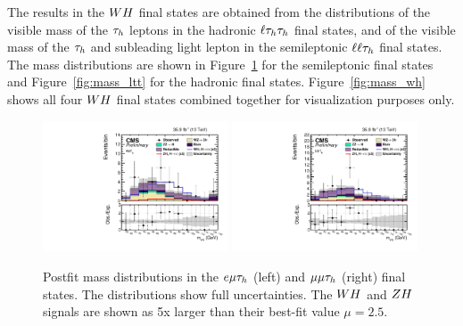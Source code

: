 The results in the $WH$ final states are obtained from the distributions of the 
visible mass of the $\tau_{h}$ leptons in the hadronic $\ell\tau_{h}\tau_{h}$ final states, 
and of the visible mass of the $\tau_{h}$ and subleading light lepton in the 
semileptonic $\ell\ell\tau_{h}$ final states. The mass distributions
are shown in Figure~\ref{fig:mass_llt} for the semileptonic final states 
and Figure~\ref{fig:mass_ltt} for the hadronic final states. 
Figure~\ref{fig:mass_wh} shows all four $WH$ final states combined together
for visualization purposes only.

\begin{figure}[h!]
 \begin{center}
  \includegraphics[width=0.49\textwidth]{higgs_to_taus_vh/plots/wh/emt_postfit.pdf}
  \includegraphics[width=0.49\textwidth]{higgs_to_taus_vh/plots/wh/mmt_postfit.pdf}
 \end{center}
 \caption{Postfit mass distributions in the $e\mu\tau_{h}$ (left) and 
 $\mu\mu\tau_{h}$ (right) final states.
 The distributions show full uncertainties.
 The $WH$ and $ZH$ signals are shown as 5x larger than their best-fit
 value $\mu = 2.5$.
 }
 \label{fig:mass_llt}
\end{figure}

